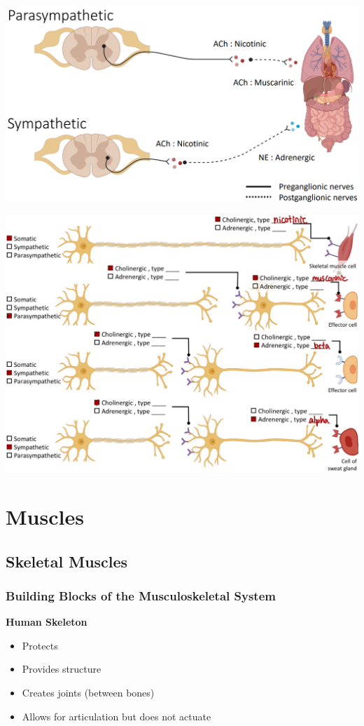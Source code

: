 \documentclass[11pt,fleqn]{book}
\begin{document}
\begin{center}
    \includegraphics[width=0.65\linewidth]{Pictures/Screenshot 2024-03-06 205513.png}
\end{center}

\begin{exercise}
    \begin{center}
    \includegraphics[width=0.95\linewidth]{Pictures/Screenshot 2024-04-03 230126.png}
\end{center}
\end{exercise}

\chapter{Muscles}
\section{Skeletal Muscles}
\subsection{Building Blocks of the Musculoskeletal System}
\textbf{Human Skeleton}
\begin{itemize}
    \item Protects
    \item Provides structure
    \item Creates joints (between bones)
    \item Allows for articulation but does not actuate
\end{itemize}
\end{document}
